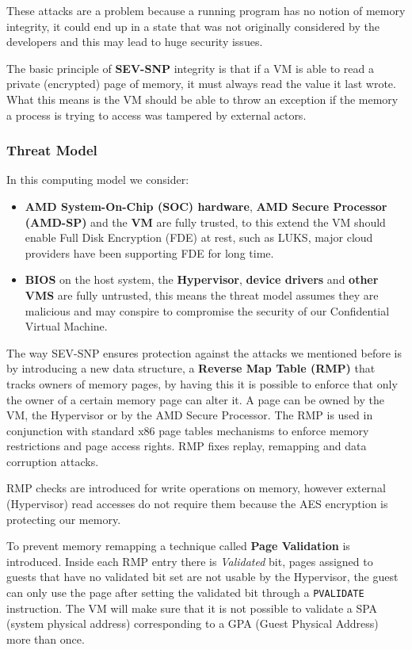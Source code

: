\documentclass[twocolumn]{article}
\begin{document}
These attacks are a problem because a running program has no notion of memory integrity, it could end up in a state that was not originally considered by the developers and this may lead to huge security issues.

The basic principle of \textbf{SEV-SNP} integrity is that if a VM is able to read a private (encrypted) page of memory, it must always read the value it last wrote. What this means is the VM should be able to throw an exception if the memory a process is trying to access was tampered by external actors.

\subsubsection{Threat Model}
In this computing model we consider:
\begin{itemize}
    \item \textbf{AMD System-On-Chip (SOC) hardware}, \textbf{AMD Secure Processor (AMD-SP)} and the \textbf{VM} are fully trusted, to this extend the VM should enable Full Disk Encryption (FDE) at rest, such as LUKS, major cloud providers have been supporting FDE for long time.
    \item \textbf{BIOS} on the host system, the \textbf{Hypervisor}, \textbf{device drivers} and \textbf{other VMS} are fully untrusted, this means the threat model assumes they are malicious and may conspire to compromise the security of our Confidential Virtual Machine.
\end{itemize}

The way SEV-SNP ensures protection against the attacks we mentioned before is by introducing a new data structure, a \textbf{Reverse Map Table (RMP)} that tracks owners of memory pages, by having this it is possible to enforce that only the owner of a certain memory page can alter it. A page can be owned by the VM, the Hypervisor or by the AMD Secure Processor. The RMP is used in conjunction with standard x86 page tables mechanisms to enforce memory restrictions and page access rights. RMP fixes replay, remapping and data corruption attacks. 

RMP checks are introduced for write operations on memory, however external (Hypervisor) read accesses do not require them because the AES encryption is protecting our memory.

To prevent memory remapping a technique called \textbf{Page Validation} is introduced. Inside each RMP entry there is \textit{Validated} bit, pages assigned to guests that have no validated bit set are not usable by the Hypervisor, the guest can only use the page after setting the validated bit through a \texttt{PVALIDATE} instruction. The VM will make sure that it is not possible to validate a SPA (system physical address) corresponding to a GPA (Guest Physical Address) more than once.
 
\end{document}
